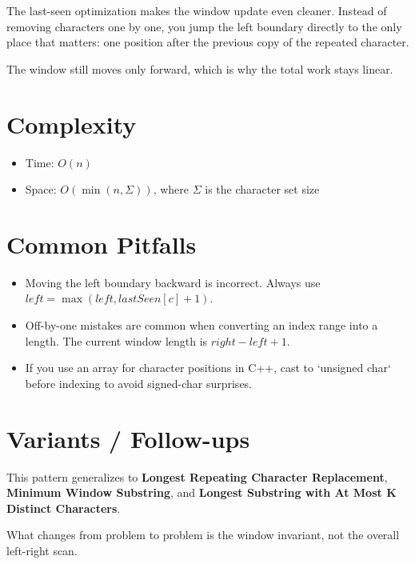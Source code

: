 The last-seen optimization makes the window update even cleaner. Instead of removing characters one by one, you jump the left boundary directly to the only place that matters: one position after the previous copy of the repeated character.

The window still moves only forward, which is why the total work stays linear.

\section{Complexity}
\begin{itemize}
\item Time: \(O(n)\)
\item Space: \(O(\min(n, \Sigma))\), where \(\Sigma\) is the character set size
\end{itemize}

\section{Common Pitfalls}
\begin{itemize}
\item Moving the left boundary backward is incorrect. Always use \(left = \max(left, lastSeen[c] + 1)\).
\item Off-by-one mistakes are common when converting an index range into a length. The current window length is \(right - left + 1\).
\item If you use an array for character positions in C++, cast to `unsigned char` before indexing to avoid signed-char surprises.
\end{itemize}

\section{Variants / Follow-ups}
This pattern generalizes to \textbf{Longest Repeating Character Replacement}, \textbf{Minimum Window Substring}, and \textbf{Longest Substring with At Most K Distinct Characters}.

What changes from problem to problem is the window invariant, not the overall left-right scan.
